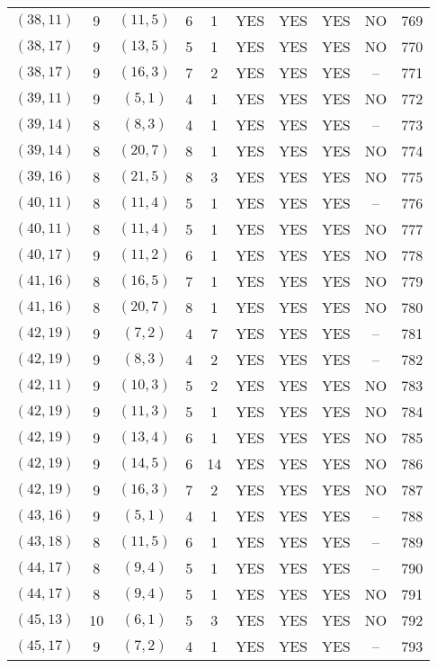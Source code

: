 \begin{longtable}{|c|c|c|c|c|c|c|c|c|c|}
$(38, 11)$ & 9 & $(11, 5)$ & 6 & 1 & YES & YES & YES & NO & 769\\
$(38, 17)$ & 9 & $(13, 5)$ & 5 & 1 & YES & YES & YES & NO & 770\\
$(38, 17)$ & 9 & $(16, 3)$ & 7 & 2 & YES & YES & YES & -- & 771\\
$(39, 11)$ & 9 & $(5, 1)$ & 4 & 1 & YES & YES & YES & NO & 772\\
$(39, 14)$ & 8 & $(8, 3)$ & 4 & 1 & YES & YES & YES & -- & 773\\
$(39, 14)$ & 8 & $(20, 7)$ & 8 & 1 & YES & YES & YES & NO & 774\\
$(39, 16)$ & 8 & $(21, 5)$ & 8 & 3 & YES & YES & YES & NO & 775\\
$(40, 11)$ & 8 & $(11, 4)$ & 5 & 1 & YES & YES & YES & -- & 776\\
$(40, 11)$ & 8 & $(11, 4)$ & 5 & 1 & YES & YES & YES & NO & 777\\
$(40, 17)$ & 9 & $(11, 2)$ & 6 & 1 & YES & YES & YES & NO & 778\\
$(41, 16)$ & 8 & $(16, 5)$ & 7 & 1 & YES & YES & YES & NO & 779\\
$(41, 16)$ & 8 & $(20, 7)$ & 8 & 1 & YES & YES & YES & NO & 780\\
$(42, 19)$ & 9 & $(7, 2)$ & 4 & 7 & YES & YES & YES & -- & 781\\
$(42, 19)$ & 9 & $(8, 3)$ & 4 & 2 & YES & YES & YES & -- & 782\\
$(42, 11)$ & 9 & $(10, 3)$ & 5 & 2 & YES & YES & YES & NO & 783\\
$(42, 19)$ & 9 & $(11, 3)$ & 5 & 1 & YES & YES & YES & NO & 784\\
$(42, 19)$ & 9 & $(13, 4)$ & 6 & 1 & YES & YES & YES & NO & 785\\
$(42, 19)$ & 9 & $(14, 5)$ & 6 & 14 & YES & YES & YES & NO & 786\\
$(42, 19)$ & 9 & $(16, 3)$ & 7 & 2 & YES & YES & YES & NO & 787\\
$(43, 16)$ & 9 & $(5, 1)$ & 4 & 1 & YES & YES & YES & -- & 788\\
$(43, 18)$ & 8 & $(11, 5)$ & 6 & 1 & YES & YES & YES & -- & 789\\
$(44, 17)$ & 8 & $(9, 4)$ & 5 & 1 & YES & YES & YES & -- & 790\\
$(44, 17)$ & 8 & $(9, 4)$ & 5 & 1 & YES & YES & YES & NO & 791\\
$(45, 13)$ & 10 & $(6, 1)$ & 5 & 3 & YES & YES & YES & NO & 792\\
$(45, 17)$ & 9 & $(7, 2)$ & 4 & 1 & YES & YES & YES & -- & 793\\

\end{longtable}
